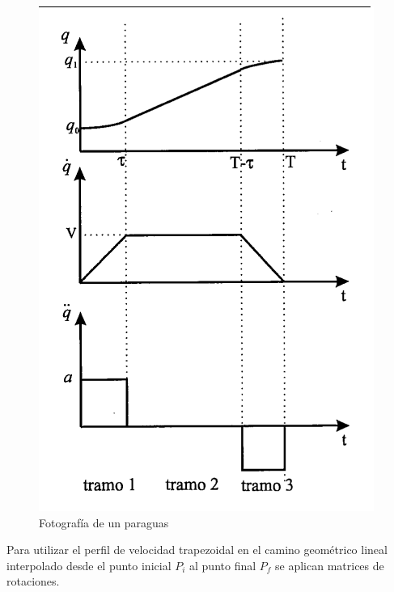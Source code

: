      \begin{figure}[htb]
            \centering
            \includegraphics[width=0.7\linewidth]{Main/Chapter6/Images6/cap6_trayectory_2.png}
            \caption{Fotografía de un paraguas}
            \label{f:cap6_trayectory_2}
        \end{figure} 


    \newpage

    Para utilizar el perfil de velocidad trapezoidal en el camino geométrico lineal interpolado desde el punto inicial $P_i$ al punto final $P_f$ se aplican matrices de rotaciones. 
    
